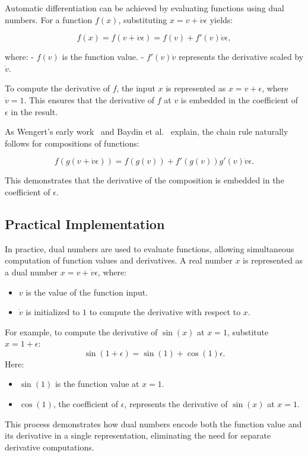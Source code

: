 \documentclass[a4paper,12pt]{article}
\begin{document}
Automatic differentiation can be achieved by evaluating functions using dual numbers. For a function \(f(x)\), substituting \(x = v + \dot{v}\epsilon\) yields:

\[
f(x) = f(v + \dot{v}\epsilon) = f(v) + f'(v)\dot{v}\epsilon,
\]

where:
- \(f(v)\) is the function value.
- \(f'(v)\dot{v}\) represents the derivative scaled by \(\dot{v}\).

To compute the derivative of \(f\), the input \(x\) is represented as \(x = v + \epsilon\), where \(\dot{v} = 1\). This ensures that the derivative of \(f\) at \(v\) is embedded in the coefficient of \(\epsilon\) in the result.

As Wengert’s early work~\cite{wengert1964automatic} and Baydin et al.~\cite{baydin2018automatic} explain, the chain rule naturally follows for compositions of functions:

\[
f(g(v + \dot{v}\epsilon)) = f(g(v)) + f'(g(v))g'(v)\dot{v}\epsilon.
\]

This demonstrates that the derivative of the composition is embedded in the coefficient of \(\epsilon\).

\subsection{Practical Implementation}

In practice, dual numbers are used to evaluate functions, allowing simultaneous computation of function values and derivatives. A real number \(x\) is represented as a dual number \(x = v + \dot{v}\epsilon\), where:
\begin{itemize}
    \item \(v\) is the value of the function input.
    \item \(\dot{v}\) is initialized to \(1\) to compute the derivative with respect to \(x\).
\end{itemize}

For example, to compute the derivative of \(\sin(x)\) at \(x = 1\), substitute \(x = 1 + \epsilon\):
\[
\sin(1 + \epsilon) = \sin(1) + \cos(1)\epsilon.
\]
Here:
\begin{itemize}
    \item \(\sin(1)\) is the function value at \(x = 1\).
    \item \(\cos(1)\), the coefficient of \(\epsilon\), represents the derivative of \(\sin(x)\) at \(x = 1\).
\end{itemize}

This process demonstrates how dual numbers encode both the function value and its derivative in a single representation, eliminating the need for separate derivative computations.
\end{document}
